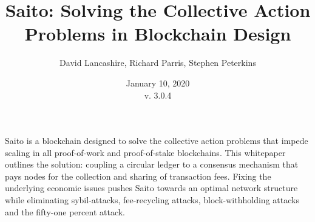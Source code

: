 \documentclass[11pt, oneside]{article}   	%
\title{Saito: Solving the Collective Action Problems in Blockchain Design }
\author{David Lancashire, Richard Parris, Stephen Peterkins}
\date{January 10, 2020\\v. 3.0.4}
\begin{document}
\maketitle


\begin{onecolabstract}
Saito is a blockchain designed to solve the collective action problems that impede scaling
in all proof-of-work and proof-of-stake blockchains. This whitepaper outlines the solution: coupling 
a circular ledger to a consensus mechanism that pays nodes for the collection and sharing of transaction
 fees. Fixing the underlying economic issues pushes Saito towards an optimal network structure while 
 eliminating sybil-attacks, fee-recycling attacks, block-withholding attacks and the fifty-one percent attack.
\end{onecolabstract}
\end{document}
